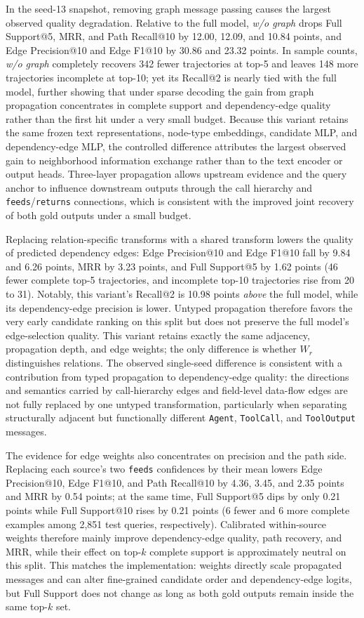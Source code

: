 In the seed-13 snapshot, removing graph message passing causes the largest
observed quality degradation. Relative to the full model, \emph{w/o graph} drops
Full Support@5, MRR, and Path Recall@10 by 12.00, 12.09, and 10.84 points,
and Edge Precision@10 and Edge F1@10 by 30.86 and 23.32 points. In sample
counts, \emph{w/o graph} completely recovers 342 fewer trajectories at
top-5 and leaves 148 more trajectories incomplete at top-10; yet its
Recall@2 is nearly tied with the full model, further showing that under
sparse decoding the gain from graph propagation concentrates in complete
support and dependency-edge quality rather than the first hit under a very
small budget. Because this variant retains the same frozen text
representations, node-type embeddings, candidate MLP, and dependency-edge
MLP, the controlled difference attributes the largest observed gain to
neighborhood information exchange rather than to the text encoder or output
heads. Three-layer propagation allows upstream evidence and the query anchor
to influence downstream outputs through the call hierarchy and
\texttt{feeds}/\texttt{returns} connections, which is consistent with the
improved joint recovery of both gold outputs under a small budget.

Replacing relation-specific transforms with a shared transform lowers the
quality of predicted dependency edges: Edge Precision@10 and Edge F1@10
fall by 9.84 and 6.26 points, MRR by 3.23 points, and Full Support@5 by
1.62 points (46 fewer complete top-5 trajectories, and incomplete top-10
trajectories rise from 20 to 31). Notably, this variant's Recall@2 is
10.98 points \emph{above} the full model, while its dependency-edge
precision is lower. Untyped propagation therefore favors the very early
candidate ranking on this split but does not preserve the full model's
edge-selection quality. This variant retains exactly the same
adjacency, propagation depth, and edge weights; the only difference is
whether $W_r$ distinguishes relations. The observed single-seed difference
is consistent with a contribution from typed propagation to dependency-edge
quality: the directions and semantics carried by call-hierarchy edges and
field-level data-flow edges are not fully replaced by one untyped
transformation, particularly when
separating structurally adjacent but functionally different \texttt{Agent},
\texttt{ToolCall}, and \texttt{ToolOutput} messages.

The evidence for edge weights also concentrates on precision and the path
side. Replacing each source's two \texttt{feeds} confidences by their mean
lowers Edge Precision@10, Edge F1@10, and Path Recall@10 by 4.36, 3.45,
and 2.35 points and MRR by 0.54 points; at the same time, Full Support@5
dips by only 0.21 points while Full Support@10 rises by 0.21 points (6 fewer
and 6 more complete examples among 2,851 test queries, respectively).
Calibrated within-source weights therefore mainly improve dependency-edge
quality, path recovery, and MRR, while their effect on top-$k$ complete
support is approximately neutral on this split. This
matches the implementation: weights directly scale propagated messages and
can alter fine-grained candidate order and dependency-edge logits, but
Full Support does not change as long as both gold outputs remain inside the
same top-$k$ set.

